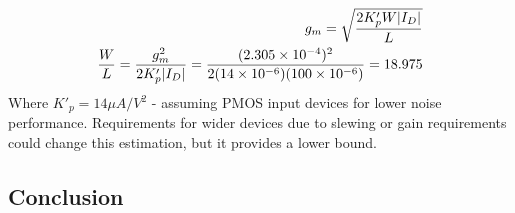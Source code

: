     \begin{align}
        g_{m} = \sqrt{\frac{2K'_{p} W |I_{D}|}{L}} \\
        \frac{W}{L} = \frac{g_{m}^{2}}{2K'_{p} |I_{D}|} = \frac{(2.305\times 10^{-4})^{2}}{2(14\times 10^{-6})(100\times 10^{-6})} = 18.975
    \end{align}
    Where $K'_{p} = 14\mu A/V^{2}$ - assuming PMOS input devices for lower noise performance.
    Requirements for wider devices due to slewing or gain requirements could change this estimation, but it provides a lower bound.

\subsection{Conclusion}
\label{Design:conclusion}



